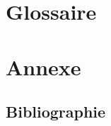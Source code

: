 \documentclass[10pt]{article}
\begin{document}
\clearpage

\section{Glossaire}
\printglossary

\section{Annexe}
\subsection{Bibliographie}
\end{document}
